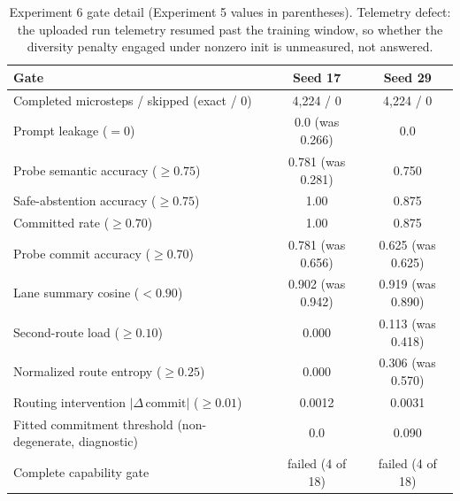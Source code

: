 \documentclass[10pt,a4paper]{article}
\newcommand{\fail}[1]{\textcolor{failred}{#1}}
\newcommand{\good}[1]{\textcolor{okgreen}{#1}}
\begin{document}
\begin{table}[htbp]
\caption{Experiment 6 gate detail (Experiment 5 values in parentheses). Telemetry defect: the uploaded run telemetry resumed past the training window, so whether the diversity penalty engaged under nonzero init is unmeasured, not answered.}
\label{tab:app-exp6-gates}
\centering\footnotesize
\begin{tabularx}{\textwidth}{@{}Xcc@{}}
\toprule
Gate & Seed 17 & Seed 29 \\
\midrule
Completed microsteps / skipped (exact / 0) & 4{,}224 / 0 & 4{,}224 / 0 \\
Prompt leakage ($= 0$) & \good{0.0} (was 0.266) & 0.0 \\
Probe semantic accuracy ($\geq 0.75$) & \good{0.781} (was 0.281) & 0.750 \\
Safe-abstention accuracy ($\geq 0.75$) & 1.00 & 0.875 \\
Committed rate ($\geq 0.70$) & 1.00 & 0.875 \\
Probe commit accuracy ($\geq 0.70$) & 0.781 (was 0.656) & \fail{0.625} (was 0.625) \\
Lane summary cosine ($< 0.90$) & \fail{0.902} (was 0.942) & \fail{0.919} (was 0.890) \\
Second-route load ($\geq 0.10$) & \fail{0.000} & 0.113 (was 0.418) \\
Normalized route entropy ($\geq 0.25$) & \fail{0.000} & 0.306 (was 0.570) \\
Routing intervention $\lvert\Delta\,\mathrm{commit}\rvert$ ($\geq 0.01$) & \fail{0.0012} & \fail{0.0031} \\
Fitted commitment threshold (non-degenerate, diagnostic) & \fail{0.0} & 0.090 \\
Complete capability gate & \fail{failed (4 of 18)} & \fail{failed (4 of 18)} \\
\bottomrule
\end{tabularx}
\end{table}
\end{document}
